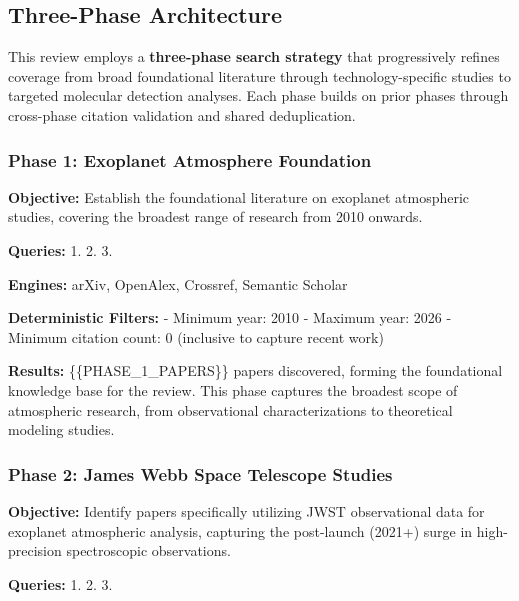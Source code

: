 \documentclass[
]{article}
\begin{document}
\subsection{Three-Phase Architecture}\label{three-phase-architecture}

This review employs a \textbf{three-phase search strategy} that
progressively refines coverage from broad foundational literature
through technology-specific studies to targeted molecular detection
analyses. Each phase builds on prior phases through cross-phase citation
validation and shared deduplication.

\subsubsection{Phase 1: Exoplanet Atmosphere
Foundation}\label{phase-1-exoplanet-atmosphere-foundation}

\textbf{Objective:} Establish the foundational literature on exoplanet
atmospheric studies, covering the broadest range of research from 2010
onwards.

\textbf{Queries:} 1.
 2.
 3.

\textbf{Engines:} arXiv, OpenAlex, Crossref, Semantic Scholar

\textbf{Deterministic Filters:} - Minimum year: 2010 - Maximum year:
2026 - Minimum citation count: 0 (inclusive to capture recent work)

\textbf{Results:} \{\{PHASE\_1\_PAPERS\}\} papers discovered, forming
the foundational knowledge base for the review. This phase captures the
broadest scope of atmospheric research, from observational
characterizations to theoretical modeling studies.

\subsubsection{Phase 2: James Webb Space Telescope
Studies}\label{phase-2-james-webb-space-telescope-studies}

\textbf{Objective:} Identify papers specifically utilizing JWST
observational data for exoplanet atmospheric analysis, capturing the
post-launch (2021+) surge in high-precision spectroscopic observations.

\textbf{Queries:} 1.
2.  3.
\end{document}
